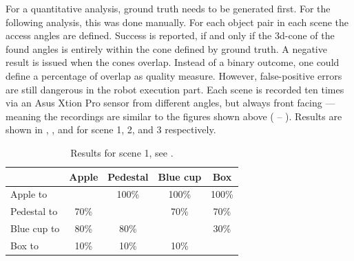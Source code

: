 For a quantitative analysis, ground truth needs to be generated first.
For the following analysis, this was done manually.
For each object pair in each scene the access angles are defined.
Success is reported, if and only if the 3d-cone of the found angles is entirely within the cone defined by ground truth.
A negative result is issued when the cones overlap.
Instead of a binary outcome, one could define a percentage of overlap as quality measure.
However, false-positive errors are still dangerous in the robot execution part.
Each scene is recorded ten times via an Asus Xtion Pro sensor from different angles, but always front facing --- meaning the recordings are similar to the figures shown above ( -- ).
Results are shown in , , and  for scene 1, 2, and 3 respectively.

\begin{table}[]
  \centering
  \begin{tabular}{l|cccc}
    \toprule
                & Apple   & Pedestal  & Blue cup  & Box\\
    \midrule
    Apple to    &         & 100\%     & 100\%     & 100\%\\
    Pedestal to & 70\%    &           & 70\%      & 70\%\\
    Blue cup to & 80\%    & 80\%      &           & 30\%\\
    Box to      & 10\%    & 10\%      & 10\%      &\\
    \bottomrule
  \end{tabular}
  \caption{Results for scene 1, see .}
  \label{tab:sec_resultsgeometricalreasoning_experiments_scene1}
\end{table}

